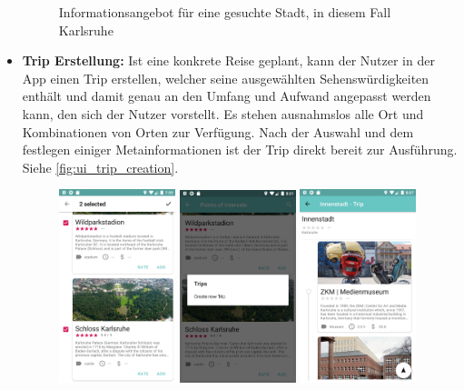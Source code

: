\begin{itemize}
\begin{figure}[ht!]
		\caption{Informationsangebot für eine gesuchte Stadt, in diesem Fall Karlsruhe}
		\label{fig:ui_city_information}
	\end{figure}


	\item \textbf{Trip Erstellung:} Ist eine konkrete Reise geplant, kann der Nutzer in der App einen Trip erstellen, welcher seine ausgewählten Sehenswürdigkeiten enthält und damit genau an den Umfang und Aufwand angepasst werden kann, den sich der Nutzer vorstellt. Es stehen ausnahmslos alle Ort und Kombinationen von Orten zur Verfügung. Nach der Auswahl und dem festlegen einiger Metainformationen ist der Trip direkt bereit zur Ausführung. Siehe \autoref{fig:ui_trip_creation}.
	
	\begin{figure}[ht!]
		\includegraphics[width=0.32\textwidth]{images/travlyn-screenshot-stops-detail-selection.png}
		\includegraphics[width=0.32\textwidth]{images/travlyn-screenshot-stops-detail-selection-dialog.png}
		\includegraphics[width=0.32\textwidth]{images/travlyn-screenshot-trip-detail.png}

\end{figure}
\end{itemize}
